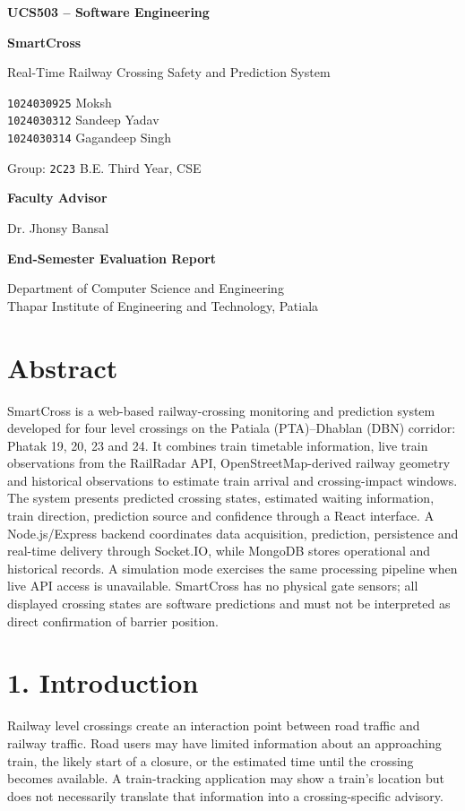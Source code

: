 \documentclass[12pt,a4paper]{report}
\newcommand{\CourseHeader}{UCS503 -- Software Engineering}
\newcommand{\ProjectName}{SmartCross}
\newcommand{\ProjectSubtitle}{Real-Time Railway Crossing Safety and Prediction System}
\newcommand{\StudentDetails}{\texttt{1024030925} Moksh\\\texttt{1024030312} Sandeep Yadav\\\texttt{1024030314} Gagandeep Singh}
\newcommand{\GroupDetails}{Group: \texttt{2C23} \quad B.E. Third Year, CSE}
\newcommand{\AdvisorDetails}{Dr. Jhonsy Bansal}
\begin{document}
\begin{titlepage}\centering\vspace*{1.5cm}
{\Large\bfseries \CourseHeader\par}\vspace{2cm}
{\Huge\bfseries \ProjectName\par}\vspace{.6cm}
{\Large \ProjectSubtitle\par}\vspace{2cm}
{\large \StudentDetails\par}\vspace{1cm}
{\large \GroupDetails\par}\vspace{1cm}
{\large\bfseries Faculty Advisor\par}{\large \AdvisorDetails\par}
\vfill{\Large\bfseries End-Semester Evaluation Report\par}\vspace{.4cm}
Department of Computer Science and Engineering\\Thapar Institute of Engineering and Technology, Patiala
\end{titlepage}
\tableofcontents
\chapter*{Abstract}
SmartCross is a web-based railway-crossing monitoring and prediction system developed for four level crossings on the Patiala (PTA)--Dhablan (DBN) corridor: Phatak 19, 20, 23 and 24. It combines train timetable information, live train observations from the RailRadar API, OpenStreetMap-derived railway geometry and historical observations to estimate train arrival and crossing-impact windows. The system presents predicted crossing states, estimated waiting information, train direction, prediction source and confidence through a React interface. A Node.js/Express backend coordinates data acquisition, prediction, persistence and real-time delivery through Socket.IO, while MongoDB stores operational and historical records. A simulation mode exercises the same processing pipeline when live API access is unavailable. SmartCross has no physical gate sensors; all displayed crossing states are software predictions and must not be interpreted as direct confirmation of barrier position.
\chapter{1. Introduction}
Railway level crossings create an interaction point between road traffic and railway traffic. Road users may have limited information about an approaching train, the likely start of a closure, or the estimated time until the crossing becomes available. A train-tracking application may show a train's location but does not necessarily translate that information into a crossing-specific advisory.
\end{document}
